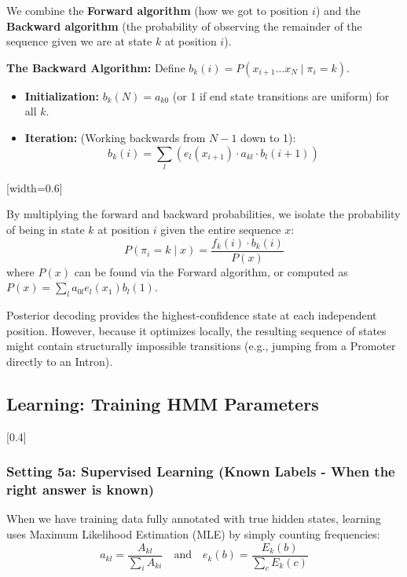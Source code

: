 We combine the \textbf{Forward algorithm} (how we got to position \( i \)) and the \textbf{Backward algorithm} (the probability of observing the remainder of the sequence given we are at state \( k \) at position \( i \)).

\textbf{The Backward Algorithm:}
Define \( b_k(i) = P(x_{i+1} \dots x_N \mid \pi_i = k) \).
\begin{itemize}
    \item \textbf{Initialization:} \( b_k(N) = a_{k0} \) (or 1 if end state transitions are uniform) for all \( k \).
    \item \textbf{Iteration:} (Working backwards from \( N-1 \) down to 1):
    \[ b_k(i) = \sum_l \left( e_l(x_{i+1}) \cdot a_{kl} \cdot b_l(i+1) \right) \]
\end{itemize}

[width=0.6\textwidth]

By multiplying the forward and backward probabilities, we isolate the probability of being in state \( k \) at position \( i \) given the entire sequence \( x \):
\[ P(\pi_i = k \mid x) = \frac{f_k(i) \cdot b_k(i)}{P(x)} \]
where \( P(x) \) can be found via the Forward algorithm, or computed as \( P(x) = \sum_l a_{0l} e_l(x_1) b_l(1) \).

\sta Posterior decoding provides the highest-confidence state at each independent position. However, because it optimizes locally, the resulting sequence of states might contain structurally impossible transitions (e.g., jumping from a Promoter directly to an Intron).

\subsection{Learning: Training HMM Parameters}

[0.4]

\subsubsection{Setting 5a: Supervised Learning (Known Labels - When the right answer is known)}

When we have training data fully annotated with true hidden states, learning uses Maximum Likelihood Estimation (MLE) by simply counting frequencies:
\[ a_{kl} = \frac{A_{kl}}{\sum_i A_{ki}} \quad \text{and} \quad e_k(b) = \frac{E_k(b)}{\sum_c E_k(c)} \]

